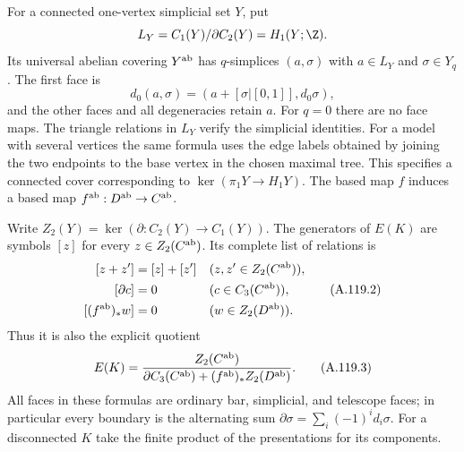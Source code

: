 For a connected one-vertex simplicial set $Y$, put
\[
 L_Y=C_1(Y)/\partial C_2(Y)=H_1(Y;\Z).
\]
Its universal abelian covering $Y^{\rm ab}$ has $q$-simplices
$(a,\sigma)$ with $a\in L_Y$ and $\sigma\in Y_q$. The first face is
\[
 d_0(a,\sigma)=
 (a+[\sigma|[0,1]],d_0\sigma),
\]
and the other faces and all degeneracies retain $a$. For $q=0$ there
are no face maps. The triangle relations in $L_Y$ verify the
simplicial identities. For a model with several vertices the same
formula uses the edge labels obtained by joining the two endpoints
to the base vertex in the chosen maximal tree. This specifies a
connected cover corresponding to
$\ker(\pi_1Y\to H_1Y)$. The based map $f$ induces a based map
$f^{\rm ab}:D^{\rm ab}\to C^{\rm ab}$.

Write $Z_2(Y)=\ker(\partial:C_2(Y)\to C_1(Y))$. The generators of
$E(K)$ are symbols $[z]$ for every $z\in Z_2(C^{\rm ab})$. Its
complete list of relations is
\[
\begin{aligned}
 [z+z']&=[z]+[z'] &&(z,z'\in Z_2(C^{\rm ab})),\\
 [\partial c]&=0 &&(c\in C_3(C^{\rm ab})),\\
 [(f^{\rm ab})_*w]&=0 &&(w\in Z_2(D^{\rm ab})).
\end{aligned}                                                   \tag{A.119.2}
\]
Thus it is also the explicit quotient
\[
 E(K)=\frac{Z_2(C^{\rm ab})}
 {\partial C_3(C^{\rm ab})+(f^{\rm ab})_*Z_2(D^{\rm ab})}.
                                                               \tag{A.119.3}
\]
All faces in these formulas are ordinary bar, simplicial, and
telescope faces; in particular every boundary is the alternating sum
$\partial\sigma=\sum_i(-1)^id_i\sigma$. For a disconnected $K$
take the finite product of the presentations for its components.

